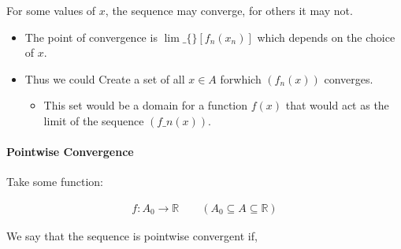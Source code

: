 \documentclass[class=article, crop=false]{standalone}
\begin{document}
 For some values of \(x\), the sequence may converge, for others it
may not.

\begin{itemize}
\item
  The point of convergence is
  \( \lim\_\{\}\left[ f_n\left( x_n \right)  \right] \) which depends on
  the choice of \(x\).
\item
  Thus we could Create a set of all \(x \in A\) forwhich
  \(\left( f_n\left( x \right) \right)\) converges.

  \begin{itemize}
  \item
    This set would be a domain for a function $f\left( x \right)$
    that would act as the limit of the sequence \(\left( f\_n\left( x
    \right) \right) \).
  \end{itemize}
\end{itemize}

\hypertarget{pointwise-convergence}{%
\paragraph{Pointwise Convergence}\label{pointwise-convergence}}

Take some function:

  \begin{align*}
  f: A_0     \rightarrow  \mathbb{R} \qquad \left( A_0 \subseteq A \subseteq \mathbb{R}  \right)
  \end{align*}

We say that the sequence is pointwise convergent if,
\end{document}

